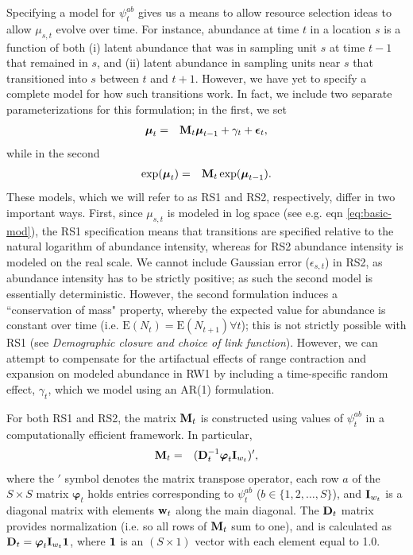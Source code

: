 \documentclass[times,mee,doublespace,]{besauth2}
\begin{document}
Specifying a model for $\psi^{ab}_t$ gives us a means to allow resource selection ideas to allow $\mu_{s,t}$ evolve over time.  For instance, abundance at time $t$ in a location $s$ is a function of both (i) latent abundance that was in sampling unit $s$ at time $t-1$ that remained in $s$, and (ii) latent abundance in sampling units near $s$ that transitioned into $s$ between $t$ and $t+1$.  However, we have yet to specify a complete model for how such transitions work.  In fact, we include two separate parameterizations for this formulation; in the first, we set
\begin{eqnarray*}
  \boldsymbol{\mu}_t & = & {\bf M}_t \boldsymbol{\mu}_{t-1} + \gamma_t + \boldsymbol{\epsilon}_t, %
\end{eqnarray*}
while in the second
\begin{eqnarray*}
  \exp(\boldsymbol{\mu}_t) & = & {\bf M}_t \exp(\boldsymbol{\mu}_{t-1}). %
\end{eqnarray*}
These models, which we will refer to as RS1 and RS2, respectively, differ in two important ways.  First, since $\mu_{s,t}$ is modeled in log space (see e.g. eqn \ref{eq:basic-mod}), the RS1 specification means that transitions are specified relative to the natural logarithm of abundance intensity, whereas for RS2 abundance intensity is modeled on the real scale.  We cannot include Gaussian error ($\epsilon_{s,t}$) in RS2, as abundance intensity has to be strictly positive; as such the second model is essentially deterministic.  However, the second formulation induces a ``conservation of mass" property, whereby the expected value for abundance is constant over time (i.e. $\text{E}(N_t) = \text{E}(N_{t+1}) \forall t$); this is not strictly possible with RS1 (see {\it Demographic closure and choice of link function}).  However, we can attempt to compensate for the artifactual effects of range contraction and expansion on modeled abundance in RW1 by including a time-specific random effect, $\gamma_t$, which we model using an AR(1) formulation.

For both RS1 and RS2, the matrix ${\bf M}_t$ is constructed using values of $\psi_t^{ab}$ in a computationally efficient framework.  In particular,
\begin{eqnarray}
  {\bf M}_t & = & ({\bf D}_t^{-1} \boldsymbol{\varphi}_t {\bf I}_{w_t})^\prime, \label{eq:M}
\end{eqnarray}
where the $\prime$ symbol denotes the matrix transpose operator, each row $a$ of the $S \times S$ matrix $\boldsymbol{\varphi}_t$ holds entries corresponding to $\psi_t^{ab}$ ($b \in \{ 1,2,\hdots,S \}$), and ${\bf I}_{w_t}$ is a diagonal matrix with elements ${\bf w}_t$ along the main diagonal.  The  ${\bf D}_t$ matrix provides normalization (i.e. so all rows of ${\bf M}_t$ sum to one), and is calculated as ${\bf D}_t = \boldsymbol{\varphi}_t {\bf I}_{w_t} {\bf 1}$, where ${\bf 1}$ is an $(S \times 1)$ vector with each element equal to 1.0.
\end{document}

